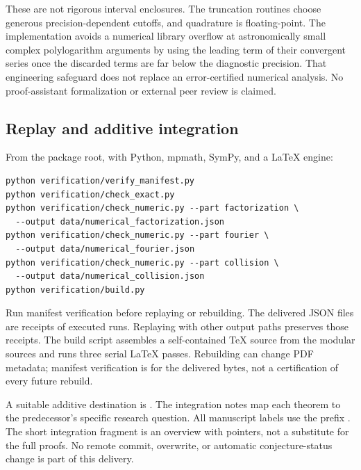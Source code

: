 These are not rigorous interval enclosures. The truncation routines
choose generous precision-dependent cutoffs, and quadrature is
floating-point. The implementation avoids a numerical library overflow
at astronomically small complex polylogarithm arguments by using the
leading term of their convergent series once the discarded terms are
far below the diagnostic precision. That engineering safeguard does
not replace an error-certified numerical analysis. No proof-assistant
formalization or external peer review is claimed.

\subsection{Replay and additive integration}
From the package root, with Python, mpmath, SymPy, and a LaTeX engine:
\begin{verbatim}
python verification/verify_manifest.py
python verification/check_exact.py
python verification/check_numeric.py --part factorization \
  --output data/numerical_factorization.json
python verification/check_numeric.py --part fourier \
  --output data/numerical_fourier.json
python verification/check_numeric.py --part collision \
  --output data/numerical_collision.json
python verification/build.py
\end{verbatim}
Run manifest verification before replaying or rebuilding.
The delivered JSON files are receipts of executed runs. Replaying with
other output paths preserves those receipts. The build script assembles
a self-contained TeX source from the modular sources and runs three
serial LaTeX passes. Rebuilding can change PDF metadata; manifest
verification is for the delivered bytes, not a certification of every
future rebuild.

A suitable additive destination is
.
The integration notes map each theorem to the predecessor's specific
research question. All manuscript labels use the prefix .
The short integration fragment is an overview with pointers, not a
substitute for the full proofs. No remote commit, overwrite, or
automatic conjecture-status change is part of this delivery.
